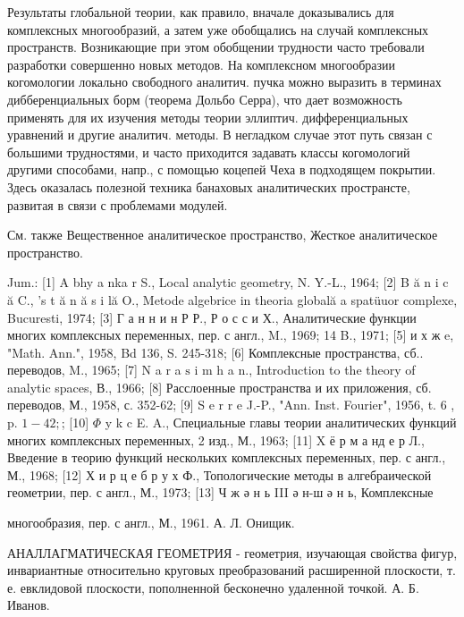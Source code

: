 \documentclass[10pt]{article}
\begin{document}
Результаты глобальной теории, как правило, вначале доказывались для комплексных многообразий, а затем уже обобщались на случай комплексных пространств. Возникающие при этом обобщении трудности часто требовали разработки совершенно новых методов. На комплексном многообразии когомологии локально свободного аналитич. пучка можно выразить в терминах дибберенциальных борм (теорема Дольбо Серра), что дает возможность применять для их изучения методы теории эллиптич. дифференциальных уравнений и другие аналитич. методы. В негладком случае этот путь связан с большими трудностями, и часто приходится задавать классы когомологий другими способами, напр., с помощью коцепей Чеха в подходящем покрытии. Здесь оказалась полезной техника банаховых аналитических пространсте, развитая в связи с проблемами модулей.



См. также Вещественное аналитическое пространство, Жесткое аналитическое пространство.



Jum.: [1] A bhy a nka r S., Local analytic geometry, N. Y.-L., 1964; [2] B ă n i c ă C., 's t ă n ă s i lă O., Metode algebrice in theoria globală a spatüuor complexe, Bucuresti, 1974; [3] Г а н н и н Р Р., Р о с с и Х., Аналитические функции многих комплексных переменных, пер. с англ., M., 1969; 14 B., 1971; [5] и х ж e, "Math. Ann.", 1958, Bd 136, S. 245-318; [6] Комплексные пространства, сб.. переводов, M., 1965; [7] $\mathrm{N}$ a $\mathrm{r}$ a $\mathrm{s}$ i m $\mathrm{h}$ a $\mathrm{n}$., Introduction to the theory of analytic spaces, В., 1966; [8] Расслоенные пространства и их приложения, сб. переводов, М., 1958, с. 352-62; [9] S e r r e J.-P., "Ann. Inst. Fourier", 1956, t. 6 , p. $1-42 ;$; [10] $\Phi$ y k c E. A., Специальные главы теории аналитических функций многих комплексных переменных, 2 изд., М., 1963; [11] X ё р м а нд е р Л., Введение в теорию функций нескольких комплексных переменных, пер. с англ., М., 1968; [12] Х и р ц е б р у х Ф., Топологические методы в алгебраической геометрии, пер. с англ., М., 1973; [13] Ч ж ә н ь III ә н-ш ә н ь, Комплексные

многообразия, пер. с англ., М., 1961. А. Л. Онищик.



АНАЛЛАГМАТИЧЕСКАЯ ГЕОМЕТРИЯ - геометрия, изучающая свойства фигур, инвариантные относительно круговых преобразований расширенной плоскости, т. е. евклидовой плоскости, пополненной бесконечно удаленной точкой. А. Б. Иванов.
\end{document}
